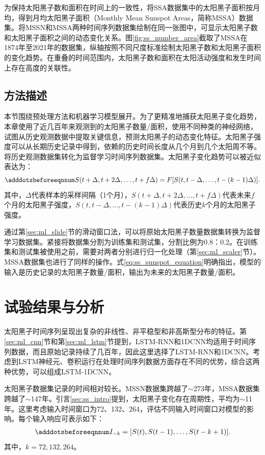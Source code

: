 为保持太阳黑子数和面积在时间上的一致性，将SSA数据集中的太阳黑子面积按月均，得到月均太阳黑子面积（Monthly Mean Sunspot Areas，简称MSSA）数据集。将MSSN和MSSA两种时间序列数据集绘制在同一张图中，可显示太阳黑子数和太阳黑子面积之间的动态变化关系。图\ref{fig:ss_number_area}截取了MSSA在1874年至2021年的数据集，纵轴按照不同尺度标准绘制太阳黑子数和太阳黑子面积的变化趋势。在重叠的时间范围内，太阳黑子数和面积在太阳活动强度和发生时间上存在高度的关联性。

\subsection{方法描述}\label{subsec:ss_method}

本节围绕预处理方法和机器学习模型展开。为了更精准地捕获太阳黑子变化趋势，本章使用了近几百年来观测到的太阳黑子数量/面积，使用不同种类的神经网络，试图从历史观测数据中提取关键信息，预测太阳黑子的动态变化特征。太阳黑子强度可以从长期历史记录中得到，依赖的历史时间长度从几个月到几个太阳周不等。将历史观测数据集转化为监督学习时间序列数据集。太阳黑子变化趋势可以被近似表达为：
\begin{equation}\adddotsbeforeeqnnum
  \label{eq:ss_sunspot_equation}
  S(t+\Delta,t+2\Delta,\ldots,t+f\Delta)=F[S(t,t-\Delta,\ldots,t-(k-1)\Delta)].
\end{equation}
其中，$\Delta$代表样本的采样间隔（1个月），$S(t+\Delta,t+2\Delta,\ldots,t+f\Delta)$代表未来$f$个月的太阳黑子强度，$S(t,t-\Delta,\ldots,t-(k-1)\Delta)$代表历史$k$个月的太阳黑子强度。

通过第\ref{sec:ml_slide}节的滑动窗口法，可以将原始太阳黑子数量数据集转换为监督学习数据集。紧接将数据集分割为训练集和测试集，分割比例为0.8：0.2。在训练集和测试集被使用之前，需要对两者分别进行归一化处理（第\ref{sec:ml_scaler}节）。MSSA数据集也进行了同样的操作。式\ref{eq:ss_sunspot_equation}明确指出，模型的输入是历史记录的太阳黑子数量/面积，输出为未来的太阳黑子数量/面积。

\section{试验结果与分析}\label{sec:ss_result}

太阳黑子时间序列呈现出复杂的非线性、非平稳型和非高斯型分布的特征。第\ref{sec:ml_cnn}节和第\ref{sec:ml_lstm}节提到，LSTM-RNN和1DCNN均适用于时间序列数据，而且原始记录持续了几百年，因此这里选择了LSTM-RNN和1DCNN。考虑到LSTM神经元、卷积运行在处理时间序列数据方面存在不同的优势，综合这两种优势，可以组成LSTM-1DCNN。

太阳黑子数据集记录的时间相对较长。MSSN数据集跨越了$\sim$273年，MSSA数据集跨越了$\sim$147年。引言\ref{sec:ss_intro}提到，太阳黑子变化存在周期性，平均为$\sim$11年。这里考虑输入时间窗口为72、132、264，评估不同输入时间窗口对模型的影响。每个输入响应可表示如下：
\begin{equation}\adddotsbeforeeqnnum
  \label{eq:ss_input}
  \begin{split}
    I_{-k}=[S(t),S(t-1),\ldots,S(t-k+1)].
  \end{split}
\end{equation}
其中，$k=72,132,264$。

